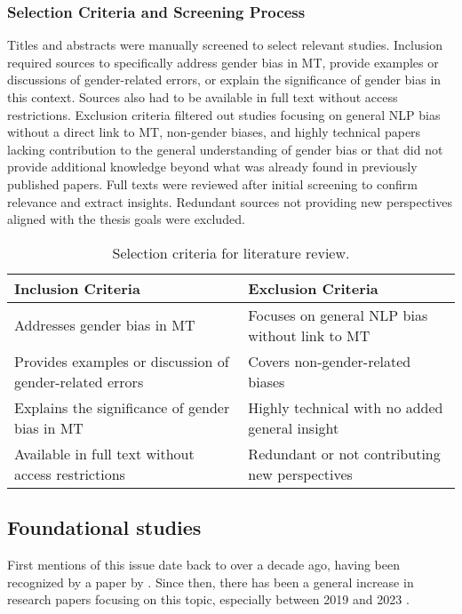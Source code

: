         \subsubsection{Selection Criteria and Screening Process}\label{subsection:selection_criteria}
        Titles and abstracts were manually screened to select relevant studies. Inclusion required sources to specifically address gender bias in MT, provide examples or discussions of gender-related errors, or explain the significance of gender bias in this context. Sources also had to be available in full text without access restrictions. Exclusion criteria filtered out studies focusing on general NLP bias without a direct link to MT, non-gender biases, and highly technical papers lacking contribution to the general understanding of gender bias or that did not provide additional knowledge beyond what was already found in previously published papers. Full texts were reviewed after initial screening to confirm relevance and extract insights. Redundant sources not providing new perspectives aligned with the thesis goals were excluded.
        
        \vspace{0.6em}
        \begin{table}[h]
            \centering
            \begin{tabularx}{\textwidth}{X X}
            \toprule
            \textbf{Inclusion Criteria} & \textbf{Exclusion Criteria} \\
            \midrule
            Addresses gender bias in MT & Focuses on general NLP bias without link to MT \\
            Provides examples or discussion of gender-related errors & Covers non-gender-related biases \\
            Explains the significance of gender bias in MT & Highly technical with no added general insight \\
            Available in full text without access restrictions & Redundant or not contributing new perspectives \\
            \bottomrule
            \end{tabularx}
            \caption{Selection criteria for literature review.}
        \end{table}

    \subsection{Foundational studies}
        First mentions of this issue date back to over a decade ago, having been recognized by a paper by \textcite{schiebingerScientificResearchMust2014}. Since then, there has been a general increase in research papers focusing on this topic, especially between 2019 and 2023 \parencite{savoldiDecadeGenderBias2025}. 

